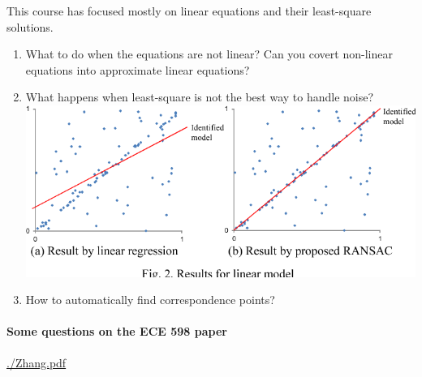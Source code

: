 \documentclass[times,singlecolumn]{article}
\begin{document}
This course has focused mostly on linear equations and their least-square solutions.
\begin{enumerate}
  \item What to do when the equations are not linear? Can you covert non-linear
    equations into approximate linear equations?
    \vspace{10em}
  \item What happens when least-square is not the best way to handle noise?
    \\
    \includegraphics[width=0.5\linewidth,trim=0 2em 0 0,clip]{media/least-square-vs-ransac.png}
    \vspace{10em}

  \item How to automatically find correspondence points?
    \\
    \vspace{10em}
\end{enumerate}

\paragraph{Some questions on the ECE 598 paper} 

\url{./Zhang.pdf}
\end{document}
